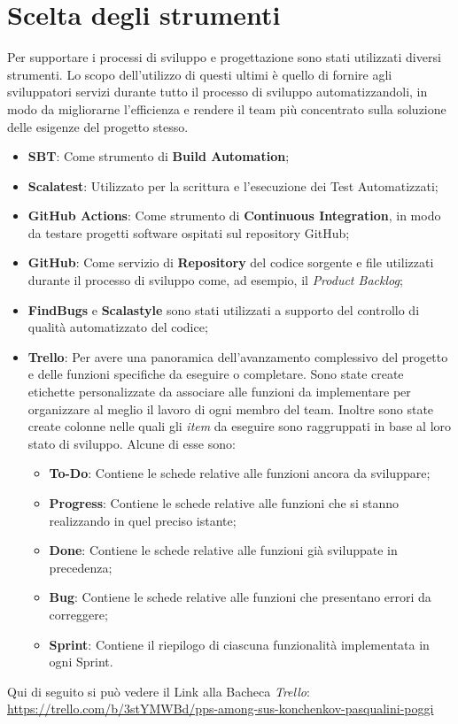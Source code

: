 \section{Scelta degli strumenti} 
Per supportare i processi di sviluppo e progettazione sono stati utilizzati diversi strumenti. Lo scopo dell'utilizzo di questi ultimi \`e quello di fornire agli sviluppatori servizi durante tutto il processo di sviluppo automatizzandoli, in modo da migliorarne l'efficienza e rendere il team pi\`u concentrato sulla soluzione delle esigenze del progetto stesso.
\begin{itemize}
    \item \textbf{SBT}: Come strumento di \textbf{Build Automation};
    \item \textbf{Scalatest}: Utilizzato per la scrittura e l'esecuzione dei Test Automatizzati;
    \item \textbf{GitHub Actions}: Come strumento di \textbf{Continuous Integration}, in modo da testare progetti software ospitati sul repository GitHub;
    \item \textbf{GitHub}: Come servizio di \textbf{Repository} del codice sorgente e file utilizzati durante il processo di sviluppo come, ad esempio, il \textit{Product Backlog};
    \item \textbf{FindBugs} e \textbf{Scalastyle} sono stati utilizzati a supporto del controllo di qualit\`a automatizzato del codice;
    \item \textbf{Trello}: Per avere una panoramica dell'avanzamento complessivo del progetto e delle funzioni specifiche da eseguire o completare. Sono state create etichette personalizzate da associare alle funzioni da implementare per organizzare al meglio il lavoro di ogni membro del team. Inoltre sono state create colonne nelle quali gli \textit{item} da eseguire sono raggruppati in base al loro stato di sviluppo. Alcune di esse sono: 
    \begin{itemize}
        \item \textbf{To-Do}: Contiene le schede relative alle funzioni ancora da sviluppare; 
        \item \textbf{Progress}: Contiene le schede relative alle funzioni che si stanno realizzando in quel preciso istante; 
        \item \textbf{Done}: Contiene le schede relative alle funzioni già sviluppate in precedenza; 
        \item \textbf{Bug}: Contiene le schede relative alle funzioni che presentano errori da correggere; 
        \item \textbf{Sprint}: Contiene il riepilogo di ciascuna funzionalit\`a implementata in ogni Sprint.
    \end{itemize}
\end{itemize}
Qui di seguito si può vedere il Link alla Bacheca \textit{Trello}:\\
\url{https://trello.com/b/3stYMWBd/pps-among-sus-konchenkov-pasqualini-poggi}